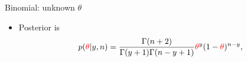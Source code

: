 \documentclass[english,t]{beamer}
\begin{document}


\begin{frame}{Binomial: unknown $\theta$}

  \begin{itemize}
  \item {\color{blue}Posterior} is
    \begin{align*}
      p({\color{red}\theta}|y,n) = \frac{\Gamma(n+2)}{\Gamma(y+1)\Gamma(n-y+1)}{\color{red}\theta}^y(1-{\color{red}\theta})^{n-y},
    \end{align*}
  \end{itemize}
  \begin{center}
  \end{center}
\end{frame}
\end{document}
